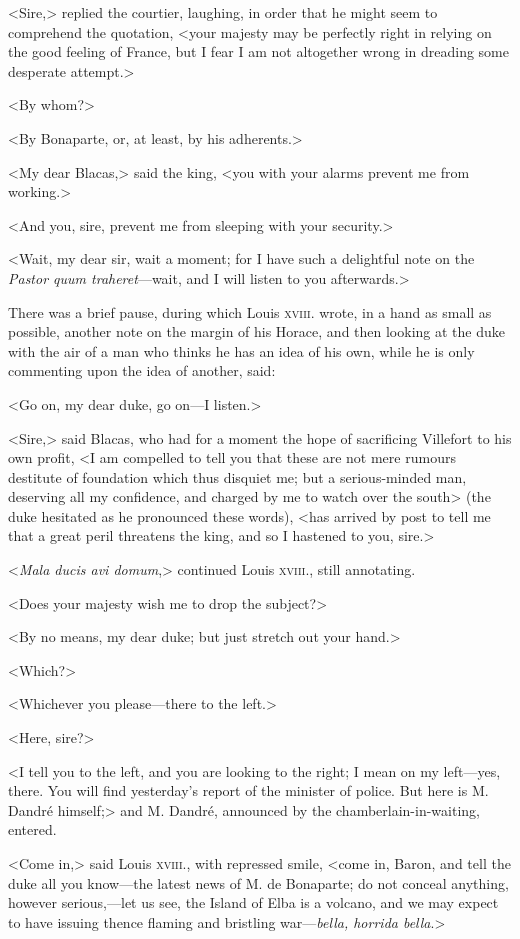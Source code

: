  <Sire,> replied the courtier, laughing, in order that he might seem to comprehend the quotation, <your majesty may be perfectly right in relying on the good feeling of France, but I fear I am not altogether wrong in dreading some desperate attempt.> 

 <By whom?> 

 <By Bonaparte, or, at least, by his adherents.> 

 <My dear Blacas,> said the king, <you with your alarms prevent me from working.> 

 <And you, sire, prevent me from sleeping with your security.> 

 <Wait, my dear sir, wait a moment; for I have such a delightful note on the \textit{Pastor quum traheret}—wait, and I will listen to you afterwards.> 

 There was a brief pause, during which Louis \textsc{xviii.} wrote, in a hand as small as possible, another note on the margin of his Horace, and then looking at the duke with the air of a man who thinks he has an idea of his own, while he is only commenting upon the idea of another, said: 

 <Go on, my dear duke, go on—I listen.> 

 <Sire,> said Blacas, who had for a moment the hope of sacrificing Villefort to his own profit, <I am compelled to tell you that these are not mere rumours destitute of foundation which thus disquiet me; but a serious-minded man, deserving all my confidence, and charged by me to watch over the south> (the duke hesitated as he pronounced these words), <has arrived by post to tell me that a great peril threatens the king, and so I hastened to you, sire.> 

 <\textit{Mala ducis avi domum},> continued Louis \textsc{xviii.}, still annotating. 

 <Does your majesty wish me to drop the subject?> 

 <By no means, my dear duke; but just stretch out your hand.> 

 <Which?> 

 <Whichever you please—there to the left.> 

 <Here, sire?> 

 <I tell you to the left, and you are looking to the right; I mean on my left—yes, there. You will find yesterday's report of the minister of police. But here is M. Dandré himself;> and M. Dandré, announced by the chamberlain-in-waiting, entered. 

 <Come in,> said Louis \textsc{xviii.}, with repressed smile, <come in, Baron, and tell the duke all you know—the latest news of M. de Bonaparte; do not conceal anything, however serious,—let us see, the Island of Elba is a volcano, and we may expect to have issuing thence flaming and bristling war—\textit{bella, horrida bella}.> 

